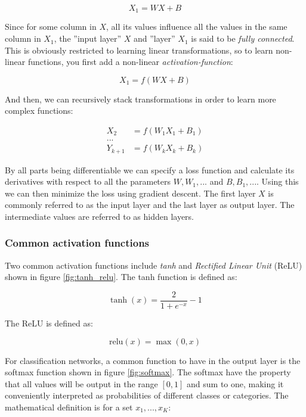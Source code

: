 \begin{equation}
    X_1 = WX + B
\end{equation}

Since for some column in $X$, all its values influence all the values in the
same column in $X_1$, the ''input layer'' $X$ and ''layer'' $X_1$ is said to be
\textit{fully connected}. This is obviously restricted to learning linear
transformations, so to learn non-linear functions, you first add a non-linear
\textit{activation-function}:

\begin{equation}
    X_1 = f(WX + B)
\end{equation}

And then, we can recursively stack transformations in order to learn more complex
functions:

\begin{align}
    X_2 &= f(W_1X_1 + B_1)\\
    ...\\
    Y_{k+1} &= f(W_kX_k + B_k)
\end{align}

By all parts being differentiable we can specify a loss function and calculate
its derivatives with respect to all the parameters $W, W_1,...$ and $B, B_1,
...$. Using this we can then minimize the loss using gradient descent. The first
layer $X$ is commonly referred to as the input layer and the last layer as output
layer. The intermediate values are referred to as hidden layers.

\subsubsection{Common activation functions}

Two common activation functions include \textit{tanh} and \textit{Rectified
Linear Unit} (ReLU) \cite{jarrett2009best} shown in figure \ref{fig:tanh_relu}. The tanh function is defined as:

\begin{equation}
    \tanh(x) = \frac{2}{1+e^{-x}} - 1
\end{equation}

The ReLU is defined as:

\begin{equation}
    \text{relu}(x) = \max (0, x)
\end{equation}

For classification networks, a common function to have in the output layer is
the softmax function shown in figure \ref{fig:softmax}. The softmax have the
property that all values will be output in the range $[0, 1]$ and sum to one,
making it conveniently interpreted as probabilities of different classes or
categories. The mathematical definition is for a set $x_1, ..., x_K$:

